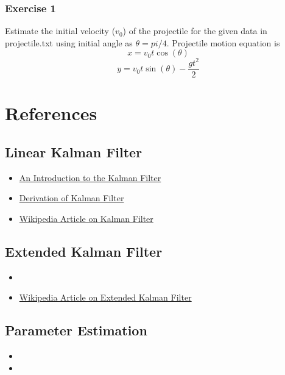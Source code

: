 \documentclass{article}
\begin{document}
\subsubsection*{Exercise 1}
Estimate the initial velocity ($v_0$) of the projectile for the given data in projectile.txt using initial angle as $\theta = pi/4$. Projectile motion equation is 
$$x=v_0t\cos(\theta)$$
$$y=v_0t\sin(\theta)-\frac{gt^2}{2}$$
\section{References}

\subsection{Linear Kalman Filter}

\begin{itemize}
\item \href{http://www.cs.unc.edu/~tracker/media/pdf/SIGGRAPH2001_CoursePack_08.pdf}{An Introduction to the Kalman Filter}
\item \href{http://www.robots.ox.ac.uk/~ian/Teaching/Estimation/LectureNotes2.pdf}{Derivation of Kalman Filter}
\item \href{https://en.wikipedia.org/wiki/Kalman_filter}{Wikipedia Article on Kalman Filter}
\end{itemize}

\subsection{Extended Kalman Filter}
\begin{itemize}
\item {}
\item \href{https://en.wikipedia.org/wiki/Extended_Kalman_filter}{Wikipedia Article on Extended Kalman Filter}
\end{itemize}

\subsection{Parameter Estimation}
\begin{itemize}
\item {}
\item {}
\end{itemize}
\end{document}
